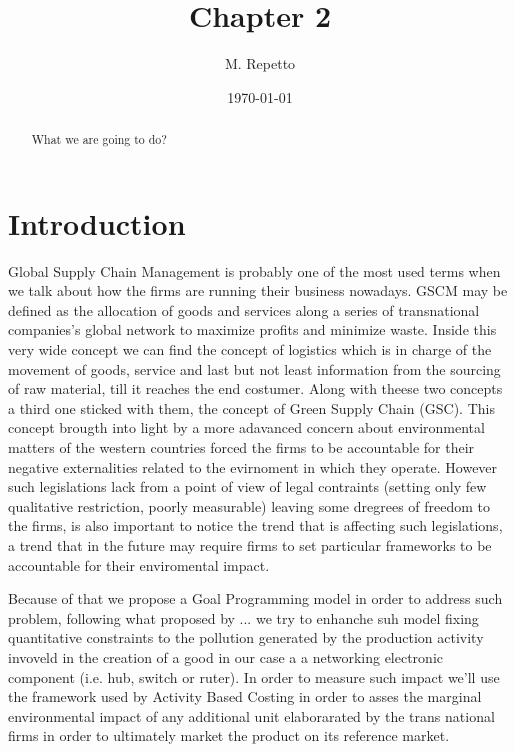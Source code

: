 \documentclass{article}
\begin{document}
\title{Chapter 2}

\author{M. Repetto}

\date{\today}

\maketitle

\begin{abstract}
What we are going to do?

\end{abstract}

\section{Introduction}
Global Supply Chain Management is probably one of the most used terms when we talk about how the firms are running their business nowadays. GSCM may be defined as the allocation of goods and services along a series of transnational companies's global network to maximize profits and minimize waste. Inside this very wide concept we can find the concept of logistics which is in charge of the movement of goods, service and last but not least information from the sourcing of raw material, till it reaches the end costumer.
Along with theese two concepts a third one sticked with them, the concept of Green Supply Chain (GSC). This concept brougth into light by a more adavanced concern about environmental matters of the western countries forced the firms to be accountable for their negative externalities related to the evirnoment in which they operate. However such legislations lack from a point of view of legal contraints (setting only few qualitative restriction, poorly measurable) leaving some dregrees of freedom to the firms, is also important to notice the trend that is affecting such legislations, a trend that in the future may require firms to set particular frameworks to be accountable for their enviromental impact.

Because of that we propose a Goal Programming model in order to address such problem, following what proposed by ... we try to enhanche suh model fixing quantitative constraints to the pollution generated by the production activity invoveld in the creation of a good in our case a a networking electronic component (i.e. hub, switch or ruter). In order to measure such impact we'll use the framework used by Activity Based Costing in order to asses the marginal environmental impact of any additional unit elaborarated by the trans national firms in order to ultimately market the product on its reference market.
\end{document}
